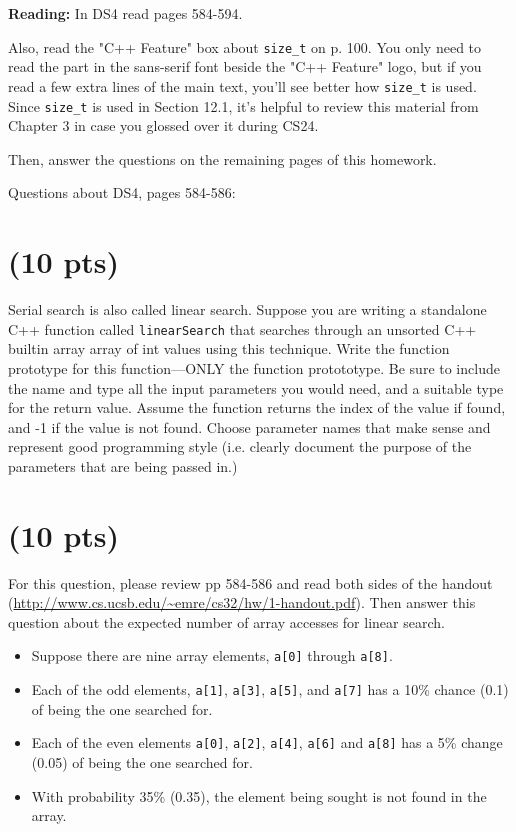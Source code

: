 \documentclass[11pt]{article}
\begin{document}
\textbf{Reading:} In DS4 read pages 584-594.

Also, read the "C++ Feature" box about \texttt{size\_t} on p. 100. You only
need to read the part in the sans-serif font beside the "C++ Feature"
logo, but if you read a few extra lines of the main text, you'll see
better how \texttt{size\_t} is used. Since \texttt{size\_t} is used in Section 12.1,
it's helpful to review this material from Chapter 3 in case you
glossed over it during CS24.

Then, answer the questions on the remaining pages of this homework.

\newpage

Questions about DS4, pages 584-586:

\section{(10 pts)}
\label{sec:orged7d330}

Serial search is also called linear search. Suppose you are writing
a standalone C++ function called \texttt{linearSearch} that searches
through an unsorted C++ builtin array array of int values using this
technique. Write the function prototype for this function—ONLY the
function protototype. Be sure to include the name and type all the
input parameters you would need, and a suitable type for the return
value. Assume the function returns the index of the value if found,
and -1 if the value is not found. Choose parameter names that make
sense and represent good programming style (i.e. clearly document
the purpose of the parameters that are being passed in.)

\vspace{8em}

\section{(10 pts)}
\label{sec:orgfab6161}
For this question, please review pp 584-586 and read both sides of
the handout
(\url{http://www.cs.ucsb.edu/\~emre/cs32/hw/1-handout.pdf}). Then
answer this question about the expected number of array accesses for
linear search.

\begin{itemize}
\item Suppose there are nine array elements, \texttt{a[0]} through \texttt{a[8]}.
\item Each of the odd elements, \texttt{a[1]}, \texttt{a[3]}, \texttt{a[5]}, and \texttt{a[7]} has a 10\% chance (0.1) of being the one searched for.
\item Each of the even elements \texttt{a[0]}, \texttt{a[2]}, \texttt{a[4]}, \texttt{a[6]} and \texttt{a[8]} has a 5\% change (0.05) of being the one searched for.
\item With probability 35\% (0.35), the element being sought is not found in the array.
\end{itemize}
\end{document}
